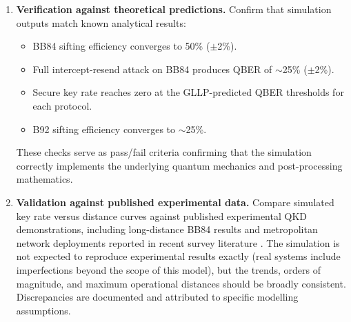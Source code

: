 \documentclass[10pt, a4paper]{report}
\begin{document}
\begin{enumerate}[label=\textbf{O5.\arabic*}, leftmargin=1.5cm]
    \item \textbf{Verification against theoretical predictions.} Confirm that simulation outputs match known analytical results:
    \begin{itemize}
        \item BB84 sifting efficiency converges to 50\% ($\pm$2\%).
        \item Full intercept-resend attack on BB84 produces QBER of $\sim$25\% ($\pm$2\%).
        \item Secure key rate reaches zero at the GLLP-predicted QBER thresholds for each protocol.
        \item B92 sifting efficiency converges to $\sim$25\%.
    \end{itemize}
    These checks serve as pass/fail criteria confirming that the simulation correctly implements the underlying quantum mechanics and post-processing mathematics.

    \item \textbf{Validation against published experimental data.} Compare simulated key rate versus distance curves against published experimental QKD demonstrations, including long-distance BB84 results \cite{Boaron2018} and metropolitan network deployments reported in recent survey literature \cite{Zhang2025}. The simulation is not expected to reproduce experimental results exactly (real systems include imperfections beyond the scope of this model), but the trends, orders of magnitude, and maximum operational distances should be broadly consistent. Discrepancies are documented and attributed to specific modelling assumptions.


\end{enumerate}
\end{document}
